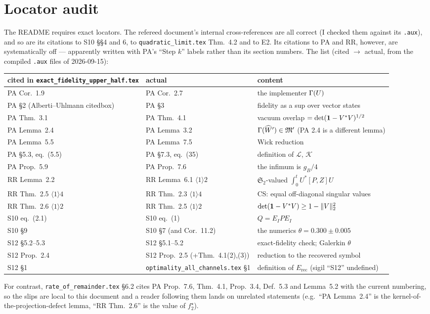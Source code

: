 \documentclass[11pt]{article}
\newcommand{\Stwo}{\mathfrak S_2}\newcommand{\Sone}{\mathfrak S_1}
\newcommand{\norm}[1]{\lVert #1\rVert}\newcommand{\abs}[1]{\lvert #1\rvert}
\newcommand{\Erec}{E_{\mathrm{rec}}}\newcommand{\Gs}{\mathcal G}
\begin{document}
\section{Locator audit}\label{sec:loc}

The README requires exact locators.  The refereed document's internal cross-references are
all correct (I checked them against its \texttt{.aux}), and so are its citations to S10
\S\S4 and 6, to \texttt{quadratic\_limit.tex} Thm.~4.2 and to E2.  Its citations to PA and
RR, however, are systematically off --- apparently written with PA's ``Step $k$'' labels
rather than its section numbers.  The list (cited $\to$ actual, from the compiled
\texttt{.aux} files of 2026-09-15):
\begin{center}\small
\begin{tabular}{lll}
\toprule
cited in \texttt{exact\_fidelity\_upper\_half.tex} & actual & content\\
\midrule
PA Cor.~1.9 & PA Cor.~2.7 & the implementer $\Gamma(U)$\\
PA \S2 (Alberti--Uhlmann citedbox) & PA \S3 & fidelity as a sup over vector states\\
PA Thm.~3.1 & PA Thm.~4.1 & vacuum overlap $=\det(\mathbf 1-V^*V)^{1/2}$\\
PA Lemma~2.4 & PA Lemma~3.2 & $\Gamma(\widehat W')\in\mathfrak M'$ (PA 2.4 is a different lemma)\\
PA Lemma~5.5 & PA Lemma~7.5 & Wick reduction\\
PA \S5.3, eq.~(5.5) & PA \S7.3, eq.~(35) & definition of $\mathcal L$, $\mathcal K$\\
PA Prop.~5.9 & PA Prop.~7.6 & the infimum is $g_B/4$\\
RR Lemma~2.2 & RR Lemma~6.1 $\langle1\rangle2$ & $\Stwo$-valued $\int_0^tU^*[P,Z]U$\\
RR Thm.~2.5 $\langle1\rangle4$ & RR Thm.~2.3 $\langle1\rangle4$ & CS: equal off-diagonal singular values\\
RR Thm.~2.6 $\langle1\rangle2$ & RR Thm.~2.5 $\langle1\rangle2$ & $\det(\one-V^*V)\ge1-\norm V_2^2$\\
S10 eq.~(2.1) & S10 eq.~(1) & $Q=E_IPE_I$\\
S10 \S9 & S10 \S7 (and Cor.~11.2) & the numerics $\theta=0.300\pm0.005$\\
S12 \S5.2--5.3 & S12 \S5.1--5.2 & exact-fidelity check; Galerkin $\theta$\\
S12 Prop.~2.4 & S12 Prop.~2.5 (+Thm.~4.1(2),(3)) & reduction to the recovered symbol\\
S12 \S1 & \texttt{optimality\_all\_channels.tex} \S1 & definition of $\Erec$ (sigil ``S12'' undefined)\\
\bottomrule
\end{tabular}
\end{center}
For contrast, \texttt{rate\_of\_remainder.tex} \S6.2 cites PA Prop.~7.6, Thm.~4.1, Prop.~3.4,
Def.~5.3 and Lemma~5.2 with the current numbering, so the slips are local to this document
and a reader following them lands on unrelated statements (e.g.\ ``PA Lemma~2.4'' is the
kernel-of-the-projection-defect lemma, ``RR Thm.~2.6'' is the value of $f_2^\star$).
\end{document}
